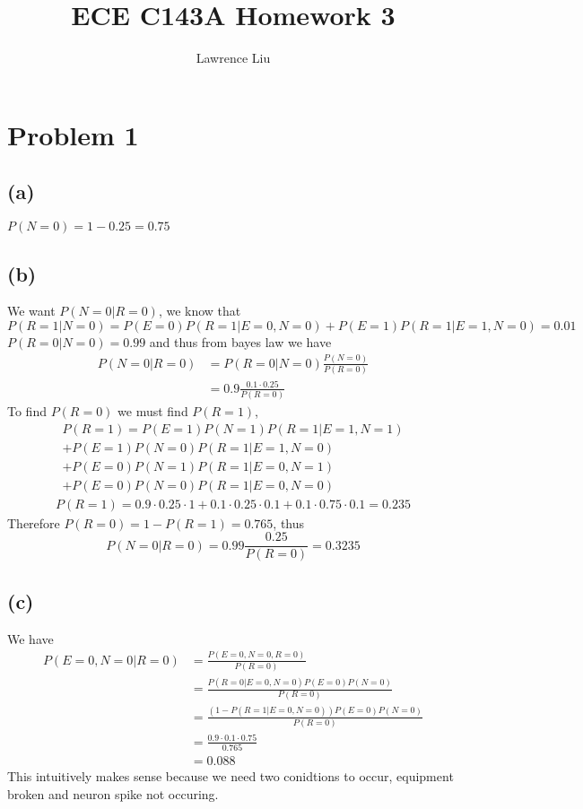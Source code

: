 \documentclass[12pt]{article}
\title{ECE C143A Homework 3}
\author{Lawrence Liu}
\begin{document}
\maketitle
\section*{Problem 1}
\subsection*{(a)}
$P(N=0)=1-0.25=\boxed{0.75}$
\subsection*{(b)}
We want $P(N=0|R=0)$, we know that
$$P(R=1|N=0)=P(E=0)P(R=1|E=0,N=0)+P(E=1)P(R=1|E=1,N=0)=0.01$$
$P(R=0|N=0)=0.99$ and thus from bayes law we have 
\begin{align*}
    P(N=0|R=0)&=P(R=0|N=0)\frac{P(N=0)}{P(R=0)}\\
    &=0.9\frac{0.1\cdot 0.25}{P(R=0)}
\end{align*}
To find $P(R=0)$ we must find $P(R=1)$,
\begin{multline*}
    P(R=1)=P(E=1)P(N=1)P(R=1|E=1,N=1)\\+P(E=1)P(N=0)P(R=1|E=1,N=0)
    \\+P(E=0)P(N=1)P(R=1|E=0,N=1)\\+P(E=0)P(N=0)P(R=1|E=0,N=0)
\end{multline*}
\begin{multline*}
    P(R=1)=0.9\cdot0.25\cdot 1+0.1\cdot0.25\cdot0.1+0.1\cdot 0.75\cdot 0.1=0.235
\end{multline*}
Therefore $P(R=0)=1-P(R=1)=0.765$, thus
$$P(N=0|R=0)=0.99\frac{0.25}{P(R=0)}=\boxed{0.3235}$$
\subsection*{(c)}
We have
\begin{align*}
    P(E=0,N=0|R=0)&=\frac{P(E=0,N=0,R=0)} {P(R=0)}\\
    &=\frac{P(R=0|E=0,N=0)P(E=0)P(N=0)} {P(R=0)}\\
    &=\frac{(1-P(R=1|E=0,N=0))P(E=0)P(N=0)} {P(R=0)}\\
    &=\frac{0.9\cdot0.1\cdot0.75}{0.765}\\
    &=\boxed{0.088}
\end{align*}
This intuitively makes sense because we need two conidtions to occur, equipment broken and neuron spike not occuring.
\end{document}
